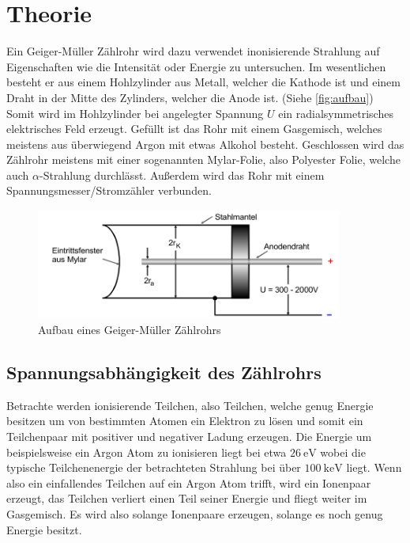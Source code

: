 \section{Theorie}
\label{sec:Theorie}

Ein Geiger-Müller Zählrohr wird dazu verwendet inonisierende Strahlung auf Eigenschaften wie die Intensität oder Energie zu untersuchen.
Im wesentlichen besteht er aus einem Hohlzylinder aus Metall, welcher die Kathode ist und einem Draht in der Mitte des Zylinders, welcher die Anode ist. (Siehe \autoref{fig:aufbau})
Somit wird im Hohlzylinder bei angelegter Spannung $U$ ein radialsymmetrisches elektrisches Feld erzeugt.
Gefüllt ist das Rohr mit einem Gasgemisch, welches meistens aus überwiegend Argon mit etwas Alkohol besteht.
Geschlossen wird das Zählrohr meistens mit einer sogenannten Mylar-Folie, also Polyester Folie, welche auch $\alpha$-Strahlung durchlässt.
Außerdem wird das Rohr mit einem Spannungsmesser/Stromzähler verbunden.

\begin{figure}
    \centering
    \includegraphics[width=0.9\textwidth]{images/skizze_0.png}
    \caption{Aufbau eines Geiger-Müller Zählrohrs\cite{V703}}
    \label{fig:aufbau}
\end{figure}

\subsection{Spannungsabhängigkeit des Zählrohrs}
\label{ssec:wirkungsweise}

Betrachte werden ionisierende Teilchen, also Teilchen, welche genug Energie besitzen um von bestimmten Atomen ein Elektron zu lösen und somit ein Teilchenpaar mit positiver und negativer Ladung erzeugen.
Die Energie um beispielsweise ein Argon Atom zu ionisieren liegt bei etwa $\SI{26}{\electronvolt}$ wobei die typische Teilchenenergie der betrachteten Strahlung bei über $\SI{100}{\kilo\electronvolt}$ liegt.
Wenn also ein einfallendes Teilchen auf ein Argon Atom trifft, wird ein Ionenpaar erzeugt, das Teilchen verliert einen Teil seiner Energie und fliegt weiter im Gasgemisch.
Es wird also solange Ionenpaare erzeugen, solange es noch genug Energie besitzt.

